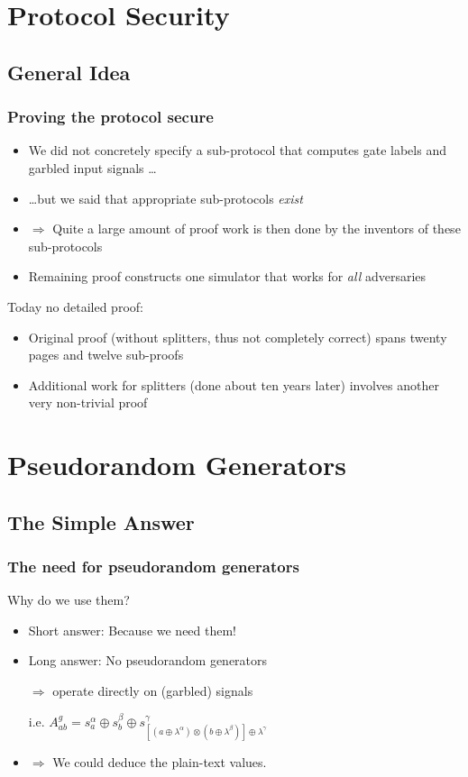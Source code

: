 \documentclass{beamer}
\begin{document}
\section{Protocol Security}

\subsection{General Idea}

\begin{frame}
  \frametitle{Proving the protocol secure}
  \begin{itemize}
  \item We did not concretely specify a sub-protocol that computes gate labels and garbled input signals \dots
  \item \dots but we said that appropriate sub-protocols \emph{exist}
  \item $\Rightarrow$ Quite a large amount of proof work is then done by the inventors of these sub-protocols
  \item Remaining proof constructs one simulator that works for \emph{all} adversaries
  \end{itemize}
  Today no detailed proof:
  \begin{itemize}
  \item Original proof (without splitters, thus not completely correct) spans twenty pages and twelve sub-proofs
  \item Additional work for splitters (done about ten years later) involves another very non-trivial proof
  \end{itemize}
\end{frame}

\section{Pseudorandom Generators}

\subsection{The Simple Answer}

\begin{frame}
  \frametitle{The need for pseudorandom generators}
  Why do we use them?
  \begin{itemize}
  \item Short answer: Because we need them!
  \item Long answer: No pseudorandom generators 

    $\Rightarrow$ operate directly on (garbled) signals
    
    i.e. $A_{ab}^g = s^\alpha_a \oplus s^\beta_b \oplus s^\gamma_{[(a\oplus\lambda^\alpha)\otimes(b\oplus\lambda^\beta)]\oplus\lambda^\gamma}$
  \item $\Rightarrow$ We could deduce the plain-text values.
  \end{itemize}
\end{frame}
\end{document}
